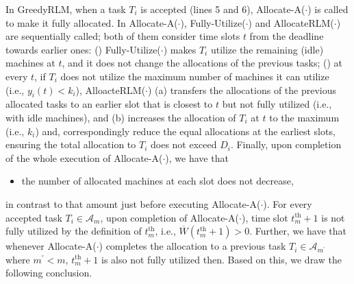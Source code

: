 \documentclass[10pt,journal,compsoc]{IEEEtran}
\newcommand{\tth}{t^{\textrm{th}}}
\newcommand{\rmnum}[1]{\romannumeral #1}
\begin{document}
In GreedyRLM, when a task $T_{i}$ is accepted (lines 5 and 6), Allocate-A($\cdot$) is called to make it fully allocated. In Allocate-A($\cdot$), Fully-Utilize($\cdot$) and AllocateRLM($\cdot$) are sequentially called; both of them consider time slots $t$ from the deadline towards earlier ones: (\rmnum{1}) Fully-Utilize($\cdot$) makes $T_{i}$ utilize the remaining (idle) machines at $t$, and it does not change the allocations of the previous tasks; (\rmnum{2}) at every $t$, if $T_{i}$ does not utilize the maximum number of machines it can utilize (i.e., $y_{i}(t)<k_{i}$), AlloacteRLM($\cdot$) (a) transfers the allocations of the previous allocated tasks to an earlier slot that is closest to $t$ but not fully utilized (i.e., with idle machines), and (b) increases the allocation of $T_{i}$ at $t$ to the maximum (i.e., $k_{i}$) and, correspondingly reduce the equal allocations at the earliest slots, ensuring the total allocation to $T_{i}$ does not exceed $D_{i}$. Finally, upon completion of the whole execution of Allocate-A($\cdot$), we have that
\begin{itemize}
\item the number of allocated machines at each slot does not decrease,
\end{itemize}
in contrast to that amount just before executing Allocate-A($\cdot$). For every accepted task $T_{i}\in\mathcal{A}_{m}$, upon completion of Allocate-A($\cdot$), time slot $\tth_{m}+1$ is not fully utilized by the definition of $\tth_{m}$, i.e., $\overline{W}(\tth_{m}+1)>0$. Further, we have that whenever Allocate-A($\cdot$) completes the allocation to a previous task $T_{i}\in \mathcal{A}_{m^{\prime}}$ where $m^{\prime}<m$, $\tth_{m}+1$ is also not fully utilized then. Based on this, we draw the following conclusion.
\end{document}

